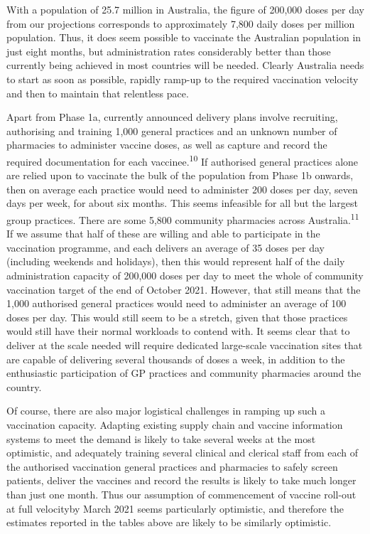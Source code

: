 \documentclass{article}
\begin{document}
With a population of 25.7 million in Australia, the figure of 200,000
doses per day from our projections corresponds to approximately 7,800
daily doses per million population. Thus, it does seem possible to
vaccinate the Australian population in just eight months, but
administration rates considerably better than those currently being
achieved in most countries will be needed. Clearly Australia needs to
start as soon as possible, rapidly ramp-up to the required vaccination
velocity and then to maintain that relentless pace.

Apart from Phase 1a, currently announced delivery plans involve
recruiting, authorising and training 1,000 general practices and an
unknown number of pharmacies to administer vaccine doses, as well as
capture and record the required documentation for each
vaccinee.\textsuperscript{10} If authorised general practices alone are
relied upon to vaccinate the bulk of the population from Phase 1b
onwards, then on average each practice would need to administer 200
doses per day, seven days per week, for about six months. This seems
infeasible for all but the largest group practices. There are some 5,800
community pharmacies across Australia.\textsuperscript{11} If we assume
that half of these are willing and able to participate in the
vaccination programme, and each delivers an average of 35 doses per day
(including weekends and holidays), then this would represent half of the
daily administration capacity of 200,000 doses per day to meet the whole
of community vaccination target of the end of October 2021. However,
that still means that the 1,000 authorised general practices would need
to administer an average of 100 doses per day. This would still seem to
be a stretch, given that those practices would still have their normal
workloads to contend with. It seems clear that to deliver at the scale
needed will require dedicated large-scale vaccination sites that are
capable of delivering several thousands of doses a week, in addition to
the enthusiastic participation of GP practices and community pharmacies
around the country.

Of course, there are also major logistical challenges in ramping up such
a vaccination capacity. Adapting existing supply chain and vaccine
information systems to meet the demand is likely to take several weeks
at the most optimistic, and adequately training several clinical and
clerical staff from each of the authorised vaccination general practices
and pharmacies to safely screen patients, deliver the vaccines and
record the results is likely to take much longer than just one month.
Thus our assumption of commencement of vaccine roll-out at full
velocityby March 2021 seems particularly optimistic, and therefore the
estimates reported in the tables above are likely to be similarly
optimistic.
\end{document}

